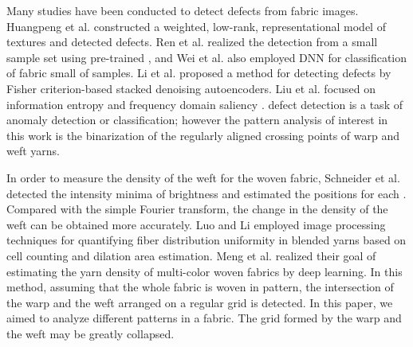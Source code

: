 Many studies have been conducted to detect defects from fabric images. Huangpeng et al. \cite{Huangpeng18} constructed a weighted, low-rank, representational model of textures and detected defects. Ren et al. \cite{Ren17} realized the detection from a small sample set using pre-trained  , and Wei et al. \cite{Wei19} also employed DNN for  classification of fabric     small   of samples. 
Li et al. \cite{Li16} proposed a method for detecting defects by Fisher criterion-based stacked denoising autoencoders. Liu et al. focused on information entropy and frequency domain saliency \cite{Liu20}. 
 
defect detection is a task of anomaly detection or classification; however the pattern analysis of interest in this work is the binarization of the regularly aligned crossing points of warp and weft yarns. 

In order to measure the density of the weft for the woven fabric, Schneider et al. detected the intensity minima of brightness and estimated the positions for each \cite{Schneider14}. Compared with the simple Fourier transform, the change in the density of the weft can be obtained more accurately. Luo and Li \cite{Luo20} employed image processing techniques for quantifying fiber distribution uniformity in blended yarns based on cell counting and dilation area estimation. Meng et al. \cite{Meng19} realized their goal of estimating the yarn density of multi-color woven fabrics by deep learning. In this method, assuming that the whole fabric is woven in  pattern, the intersection of the warp and the weft arranged on a regular grid is detected. 
In this paper, we aimed to analyze different patterns in a fabric. The grid formed by the warp and the weft may be greatly collapsed. 

